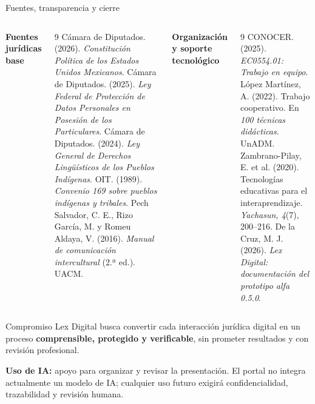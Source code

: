 \documentclass[spanish,aspectratio=169,10pt]{beamer}
\begin{document}
\begin{frame}{Fuentes, transparencia y cierre}
\scriptsize
\begin{columns}[T,onlytextwidth]
\textbf{Fuentes jurídicas base}
\begin{thebibliography}{9}
 Cámara de Diputados. (2026). \textit{Constitución Política de los Estados Unidos Mexicanos}.
 Cámara de Diputados. (2025). \textit{Ley Federal de Protección de Datos Personales en Posesión de los Particulares}.
 Cámara de Diputados. (2024). \textit{Ley General de Derechos Lingüísticos de los Pueblos Indígenas}.
 OIT. (1989). \textit{Convenio 169 sobre pueblos indígenas y tribales}.
 Pech Salvador, C. E., Rizo García, M. y Romeu Aldaya, V. (2016). \textit{Manual de comunicación intercultural} (2.ª ed.). UACM.
\end{thebibliography}
\textbf{Organización y soporte tecnológico}
\begin{thebibliography}{9}
 CONOCER. (2025). \textit{EC0554.01: Trabajo en equipo}.
 López Martínez, A. (2022). Trabajo cooperativo. En \textit{100 técnicas didácticas}. UnADM.
 Zambrano-Pilay, E. et al. (2020). Tecnologías educativas para el interaprendizaje. \textit{Yachasun, 4}(7), 200--216.
 De la Cruz, M. J. (2026). \textit{Lex Digital: documentación del prototipo alfa 0.5.0}.
\end{thebibliography}
\end{columns}
\vspace{2pt}
\begin{block}{Compromiso}
\small Lex Digital busca convertir cada interacción jurídica digital en un proceso \textbf{comprensible, protegido y verificable}, sin prometer resultados y con revisión profesional.
\end{block}
{\scriptsize\textbf{Uso de IA:} apoyo para organizar y revisar la presentación. El portal no integra actualmente un modelo de IA; cualquier uso futuro exigirá confidencialidad, trazabilidad y revisión humana.}
\end{frame}
\end{document}
